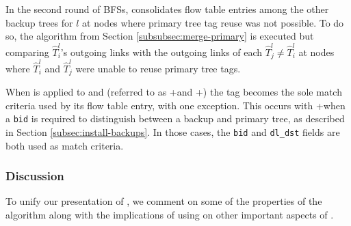 In the second round of BFSs, \merge consolidates flow table entries among the other backup trees for $l$
at nodes where primary tree tag reuse was not possible.  
To do so, the algorithm from Section \ref{subsubsec:merge-primary} is executed but comparing $\hat{T}_i^l$'s outgoing links with the outgoing links of 
each $\hat{T}_j^l \neq \hat{T}_i^l$ at nodes where $\hat{T}_i^l$ and $\hat{T}_j^l$ were unable to reuse primary tree tags. 

When \merge is applied to \pre and \post (referred to as \pres+\merge and \posts+\merges) the tag becomes the sole match criteria used by its flow table entry, with one exception.  This 
occurs with \pres+\merge when a {\tt bid} is required to distinguish between a backup and primary tree, as described in Section \ref{subsec:install-backups}. In those cases, the 
{\tt bid} and {\tt dl\_dst} fields are both used as match criteria.





\subsubsection{\mergen Discussion}
\label{subsubsec:merge-discuss}

To unify our presentation of \merges, we comment on some of the properties of the algorithm along with the implications of using \merge on other important aspects of \mdrs.

